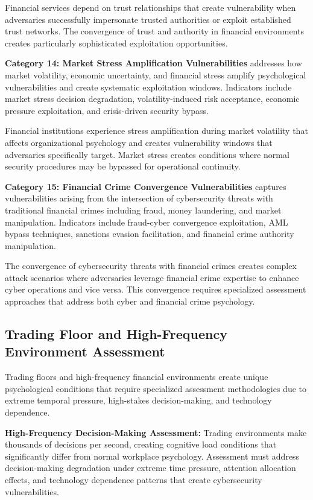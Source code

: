 \documentclass[10pt, twocolumn]{article}
\begin{document}
Financial services depend on trust relationships that create vulnerability when adversaries successfully impersonate trusted authorities or exploit established trust networks. The convergence of trust and authority in financial environments creates particularly sophisticated exploitation opportunities.

\textbf{Category 14: Market Stress Amplification Vulnerabilities} addresses how market volatility, economic uncertainty, and financial stress amplify psychological vulnerabilities and create systematic exploitation windows. Indicators include market stress decision degradation, volatility-induced risk acceptance, economic pressure exploitation, and crisis-driven security bypass.

Financial institutions experience stress amplification during market volatility that affects organizational psychology and creates vulnerability windows that adversaries specifically target. Market stress creates conditions where normal security procedures may be bypassed for operational continuity.

\textbf{Category 15: Financial Crime Convergence Vulnerabilities} captures vulnerabilities arising from the intersection of cybersecurity threats with traditional financial crimes including fraud, money laundering, and market manipulation. Indicators include fraud-cyber convergence exploitation, AML bypass techniques, sanctions evasion facilitation, and financial crime authority manipulation.

The convergence of cybersecurity threats with financial crimes creates complex attack scenarios where adversaries leverage financial crime expertise to enhance cyber operations and vice versa. This convergence requires specialized assessment approaches that address both cyber and financial crime psychology.

\subsection{Trading Floor and High-Frequency Environment Assessment}

Trading floors and high-frequency financial environments create unique psychological conditions that require specialized assessment methodologies due to extreme temporal pressure, high-stakes decision-making, and technology dependence.

\textbf{High-Frequency Decision-Making Assessment:} Trading environments make thousands of decisions per second, creating cognitive load conditions that significantly differ from normal workplace psychology. Assessment must address decision-making degradation under extreme time pressure, attention allocation effects, and technology dependence patterns that create cybersecurity vulnerabilities.
\end{document}
